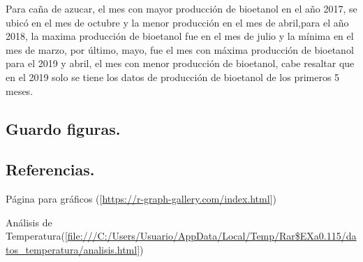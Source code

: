 \documentclass[
]{article}
\begin{document}
Para caña de azucar, el mes con mayor producción de bioetanol en el año
2017, se ubicó en el mes de octubre y la menor producción en el mes de
abril,para el año 2018, la maxima producción de bioetanol fue en el mes
de julio y la mínima en el mes de marzo, por último, mayo, fue el mes
con máxima producción de bioetanol para el 2019 y abril, el mes con
menor producción de bioetanol, cabe resaltar que en el 2019 solo se
tiene los datos de producción de bioetanol de los primeros 5 meses.

\subsection{Guardo figuras.}\label{guardo-figuras.}

\subsection{Referencias.}\label{referencias.}

Página para gráficos
({[}\url{https://r-graph-gallery.com/index.html}{]})

Análisis de
Temperatura({[}\url{file:///C:/Users/Usuario/AppData/Local/Temp/Rar$EXa0.115/datos_temperatura/analisis.html}{]})
\end{document}
